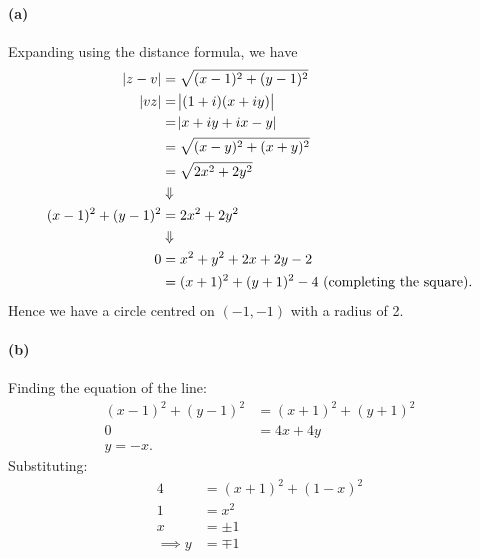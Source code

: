 \documentclass[a4paper,10pt]{article}
\begin{document}
\paragraph{(a)}
Expanding using the distance formula, we have
\begin{align*}
  \abs{z - v} &= \sqrt{(x - 1)^2 + (y - 1)^2} \\
  \abs{vz}    &= \abs{(1 + i)(x + iy)} \\
              &= \abs{x + iy + ix - y} \\
              &= \sqrt{(x - y)^2 + (x+y)^2} \\
              &= \sqrt{2x^2 + 2y^2}\\
              &\Downarrow \\
  (x - 1)^2 + (y - 1)^2 &= 2x^2 + 2y^2 \\
              &\Downarrow  \\
  0           &= x^2 + y^2 + 2x + 2y - 2 \\
              &= (x+1)^2 + (y+1)^2 - 4 \text{ (completing the square)}.
\end{align*}
Hence we have a circle centred on $ (-1, -1) $ with a radius of 2.

\paragraph{(b)}
\begin{center}\end{center}
Finding the equation of the line:
\begin{align*}
  (x - 1)^2 + (y - 1)^2 &= (x + 1)^2  + (y + 1)^2 \\
  0 &= 4x + 4y \\
  y = -x.
\end{align*}
Substituting:
\begin{align*}
  4 &= (x+1)^2 + (1-x)^2\\
  1 &= x^2\\
  x &= \pm 1\\
  \implies y &= \mp 1
\end{align*}
\end{document}
